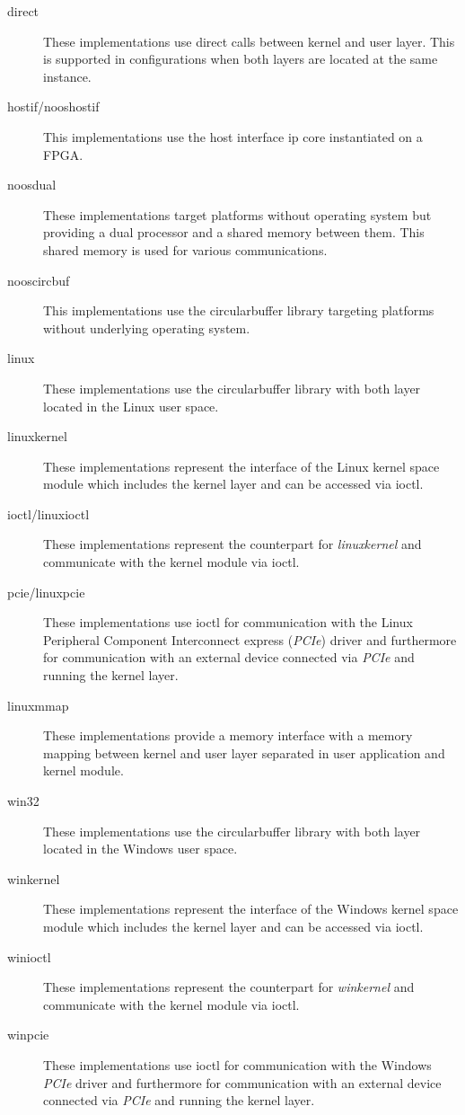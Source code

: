 \begin{description}
    \item[direct] These implementations use direct calls between kernel and user layer.
    This is supported in configurations when both layers are located at the same instance.
    \item[hostif/nooshostif] This implementations use the host interface ip core instantiated on a FPGA.
    \item[noosdual] These implementations target platforms without operating system but providing a dual processor and a shared memory between them.
    This shared memory is used for various communications.
    \item[nooscircbuf] This implementations use the circularbuffer library targeting platforms without underlying operating system.
    \item[linux] These implementations use the circularbuffer library with both layer located in the Linux user space.
    \item[linuxkernel] These implementations represent the interface of the Linux kernel space module which includes the kernel layer and can be accessed via ioctl.
    \item[ioctl/linuxioctl] These implementations represent the counterpart for \emph{linuxkernel} and communicate with the kernel module via ioctl.
    \item[pcie/linuxpcie] These implementations use ioctl for communication with the Linux Peripheral Component Interconnect express (\emph{PCIe}) driver and furthermore for communication with an external device connected via \emph{PCIe} and running the kernel layer.
    \item[linuxmmap] These implementations provide a memory interface with a memory mapping between kernel and user layer separated in user application and kernel module.
    \item[win32] These implementations use the circularbuffer library with both layer located in the Windows user space.
    \item[winkernel] These implementations represent the interface of the Windows kernel space module which includes the kernel layer and can be accessed via ioctl.
    \item[winioctl] These implementations represent the counterpart for \emph{winkernel} and communicate with the kernel module via ioctl.
    \item[winpcie] These implementations use ioctl for communication with the Windows \emph{PCIe} driver and furthermore for communication with an external device connected via \emph{PCIe} and running the kernel layer.

\end{description}

